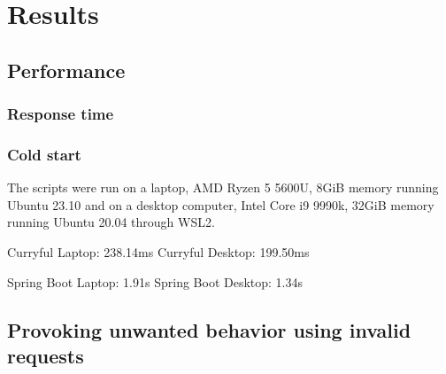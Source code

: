 \documentclass[a4paper]{article}
\begin{document}
\section{Results}
\subsection{Performance}
\subsubsection{Response time}

\subsubsection{Cold start}
The scripts were run on a laptop, AMD Ryzen 5 5600U, 8GiB memory running Ubuntu 23.10 and on a desktop computer,
Intel Core i9 9990k, 32GiB memory running Ubuntu 20.04 through WSL2.

Curryful Laptop: 238.14ms
Curryful Desktop: 199.50ms

Spring Boot Laptop: 1.91s
Spring Boot Desktop: 1.34s

\subsection{Provoking unwanted behavior using invalid requests}
\end{document}
